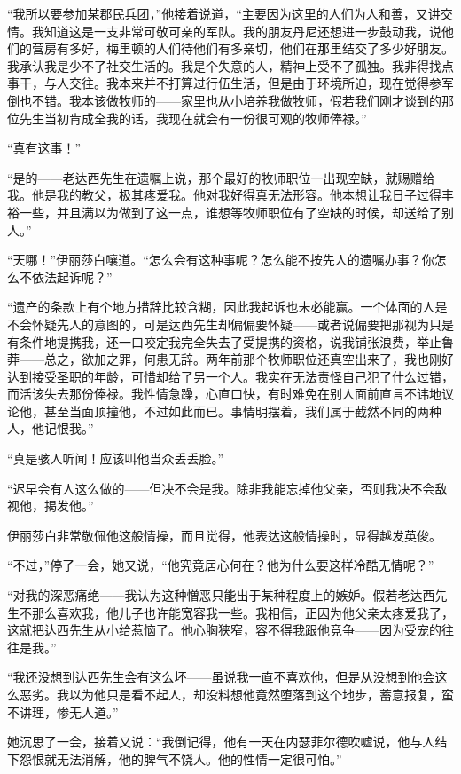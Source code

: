 \par “我所以要参加某郡民兵团，”他接着说道，“主要因为这里的人们为人和善，又讲交情。我知道这是一支非常可敬可亲的军队。我的朋友丹尼还想进一步鼓动我，说他们的营房有多好，梅里顿的人们待他们有多亲切，他们在那里结交了多少好朋友。我承认我是少不了社交生活的。我是个失意的人，精神上受不了孤独。我非得找点事干，与人交往。我本来并不打算过行伍生活，但是由于环境所迫，现在觉得参军倒也不错。我本该做牧师的——家里也从小培养我做牧师，假若我们刚才谈到的那位先生当初肯成全我的话，我现在就会有一份很可观的牧师俸禄。”
\par “真有这事！”
\par “是的——老达西先生在遗嘱上说，那个最好的牧师职位一出现空缺，就赐赠给我。他是我的教父，极其疼爱我。他对我好得真无法形容。他本想让我日子过得丰裕一些，并且满以为做到了这一点，谁想等牧师职位有了空缺的时候，却送给了别人。”
\par “天哪！”伊丽莎白嚷道。“怎么会有这种事呢？怎么能不按先人的遗嘱办事？你怎么不依法起诉呢？”
\par “遗产的条款上有个地方措辞比较含糊，因此我起诉也未必能赢。一个体面的人是不会怀疑先人的意图的，可是达西先生却偏偏要怀疑——或者说偏要把那视为只是有条件地提携我，还一口咬定我完全失去了受提携的资格，说我铺张浪费，举止鲁莽——总之，欲加之罪，何患无辞。两年前那个牧师职位还真空出来了，我也刚好达到接受圣职的年龄，可惜却给了另一个人。我实在无法责怪自己犯了什么过错，而活该失去那份俸禄。我性情急躁，心直口快，有时难免在别人面前直言不讳地议论他，甚至当面顶撞他，不过如此而已。事情明摆着，我们属于截然不同的两种人，他记恨我。”
\par “真是骇人听闻！应该叫他当众丢丢脸。”
\par “迟早会有人这么做的——但决不会是我。除非我能忘掉他父亲，否则我决不会敌视他，揭发他。”
\par 伊丽莎白非常敬佩他这般情操，而且觉得，他表达这般情操时，显得越发英俊。
\par “不过，”停了一会，她又说，“他究竟居心何在？他为什么要这样冷酷无情呢？”
\par “对我的深恶痛绝——我认为这种憎恶只能出于某种程度上的嫉妒。假若老达西先生不那么喜欢我，他儿子也许能宽容我一些。我相信，正因为他父亲太疼爱我了，这就把达西先生从小给惹恼了。他心胸狭窄，容不得我跟他竞争——因为受宠的往往是我。”
\par “我还没想到达西先生会有这么坏——虽说我一直不喜欢他，但是从没想到他会这么恶劣。我以为他只是看不起人，却没料想他竟然堕落到这个地步，蓄意报复，蛮不讲理，惨无人道。”
\par 她沉思了一会，接着又说：“我倒记得，他有一天在内瑟菲尔德吹嘘说，他与人结下怨恨就无法消解，他的脾气不饶人。他的性情一定很可怕。”
